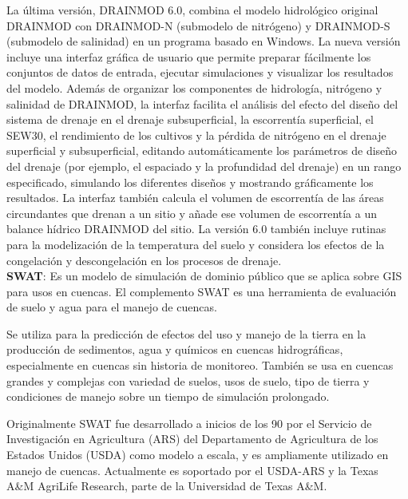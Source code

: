 La última versión, DRAINMOD 6.0, combina el modelo hidrológico original DRAINMOD con DRAINMOD-N (submodelo de nitrógeno) y DRAINMOD-S (submodelo de salinidad) en un programa basado en Windows. La nueva versión incluye una interfaz gráfica de usuario que permite preparar fácilmente los conjuntos de datos de entrada, ejecutar simulaciones y visualizar los resultados del modelo. Además de organizar los componentes de hidrología, nitrógeno y salinidad de DRAINMOD, la interfaz facilita el análisis del efecto del diseño del sistema de drenaje en el drenaje subsuperficial, la escorrentía superficial, el SEW30, el rendimiento de los cultivos y la pérdida de nitrógeno en el drenaje superficial y subsuperficial, editando automáticamente los parámetros de diseño del drenaje (por ejemplo, el espaciado y la profundidad del drenaje) en un rango especificado, simulando los diferentes diseños y mostrando gráficamente los resultados. La interfaz también calcula el volumen de escorrentía de las áreas circundantes que drenan a un sitio y añade ese volumen de escorrentía a un balance hídrico DRAINMOD del sitio. La versión 6.0 también incluye rutinas para la modelización de la temperatura del suelo y considera los efectos de la congelación y descongelación en los procesos de drenaje. \parencite{noauthor_drainmod_nodate}\\

\textbf{SWAT}: Es un modelo de simulación de dominio público que se aplica sobre GIS para usos en cuencas. El complemento SWAT es una herramienta de evaluación de suelo y agua para el manejo de cuencas.

Se utiliza para la predicción de efectos del uso y manejo de la tierra en la producción de sedimentos, agua y químicos en cuencas hidrográficas, especialmente en cuencas sin historia de monitoreo. También se usa en cuencas grandes y complejas con variedad de suelos, usos de suelo, tipo de tierra y condiciones de manejo sobre un tiempo de simulación prolongado. 

Originalmente SWAT fue desarrollado a inicios de los 90 por el Servicio de Investigación en Agricultura (ARS) del Departamento de Agricultura de los Estados Unidos (USDA) como modelo a escala, y es ampliamente utilizado en manejo de cuencas. Actualmente es soportado por el USDA-ARS y la Texas A\&M AgriLife Research, parte de la Universidad de Texas A\&M.

